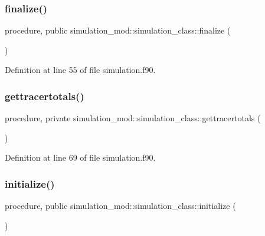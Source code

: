 \subsubsection{\texorpdfstring{finalize()}{finalize()}}
{\footnotesize\ttfamily procedure, public simulation\+\_\+mod\+::simulation\+\_\+class\+::finalize (\begin{DoxyParamCaption}{ }\end{DoxyParamCaption})}



Definition at line 55 of file simulation.\+f90.

\mbox{\label{structsimulation__mod_1_1simulation__class_ab22e46320d4a3dd0f2739894d1165a85}} 
\subsubsection{\texorpdfstring{gettracertotals()}{gettracertotals()}}
{\footnotesize\ttfamily procedure, private simulation\+\_\+mod\+::simulation\+\_\+class\+::gettracertotals (\begin{DoxyParamCaption}{ }\end{DoxyParamCaption})\hspace{0.3cm}{\ttfamily [private]}}



Definition at line 69 of file simulation.\+f90.

\mbox{\label{structsimulation__mod_1_1simulation__class_aa66177f314198046f3e05d9a0a322a22}} 
\subsubsection{\texorpdfstring{initialize()}{initialize()}}
{\footnotesize\ttfamily procedure, public simulation\+\_\+mod\+::simulation\+\_\+class\+::initialize (\begin{DoxyParamCaption}{ }\end{DoxyParamCaption})}



